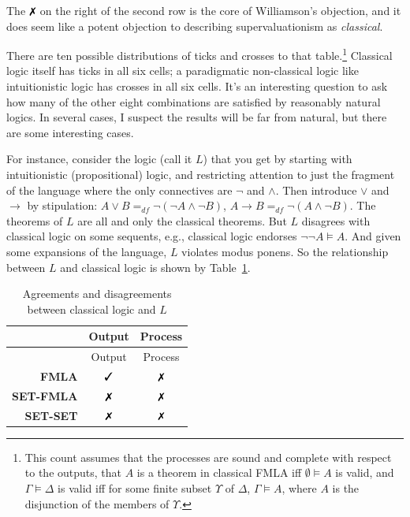 \documentclass[
  11pt,
  letterpaper,
  DIV=11,
  numbers=noendperiod,
  twoside]{scrartcl}
\newcommand{\tick}{\text{\ding{51}}}
\newcommand{\cross}{\text{\ding{55}}}
\begin{document}
The \(\cross\) on the right of the second row is the core of
Williamson's objection, and it does seem like a potent objection to
describing supervaluationism as \emph{classical}.

There are ten possible distributions of ticks and crosses to that
table.\footnote{This count assumes that the processes are sound and
  complete with respect to the outputs, that \(A\) is a theorem in
  classical FMLA iff \(\emptyset \vDash A\) is valid, and
  \(\Gamma \vDash \Delta\) is valid iff for some finite subset
  \(\Upsilon\) of \(\Delta\), \(\Gamma \vDash A\), where \(A\) is the
  disjunction of the members of \(\Upsilon\).} Classical logic itself
has ticks in all six cells; a paradigmatic non-classical logic like
intuitionistic logic has crosses in all six cells. It's an interesting
question to ask how many of the other eight combinations are satisfied
by reasonably natural logics. In several cases, I suspect the results
will be far from natural, but there are some interesting cases.

For instance, consider the logic (call it \(L\)) that you get by
starting with intuitionistic (propositional) logic, and restricting
attention to just the fragment of the language where the only
connectives are \(\neg\) and \(\wedge\). Then introduce \(\vee\) and
\(\rightarrow\) by stipulation:
\(A \vee B =_{df} \neg(\neg A \wedge \neg B)\),
\(A \rightarrow B =_{df} \neg(A \wedge \neg B)\). The theorems of \(L\)
are all and only the classical theorems. But \(L\) disagrees with
classical logic on some sequents, e.g., classical logic endorses
\(\neg \neg A \vDash A\). And given some expansions of the language,
\(L\) violates modus ponens. So the relationship between \(L\) and
classical logic is shown by Table~\ref{tbl-l}.

\begin{longtable}[]{@{}rcc@{}}
\caption{Agreements and disagreements between classical logic and
\(L\)}\label{tbl-l}\tabularnewline
\toprule\noalign{}
& Output & Process \\
\midrule\noalign{}
\endfirsthead
\toprule\noalign{}
& Output & Process \\
\midrule\noalign{}
\endhead
\bottomrule\noalign{}
\endlastfoot
\textbf{FMLA} & \(\tick\) & \(\cross\) \\
\textbf{SET-FMLA} & \(\cross\) & \(\cross\) \\
\textbf{SET-SET} & \(\cross\) & \(\cross\) \\
\end{longtable}
\end{document}

